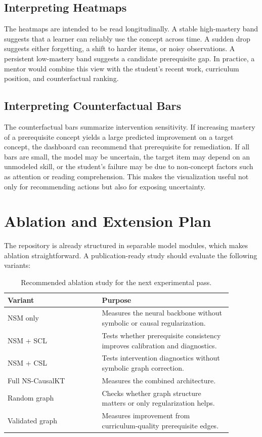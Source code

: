 \documentclass[conference]{IEEEtran}
\begin{document}
\subsection{Interpreting Heatmaps}
The heatmaps are intended to be read longitudinally. A stable high-mastery band suggests that a learner can reliably use the concept across time. A sudden drop suggests either forgetting, a shift to harder items, or noisy observations. A persistent low-mastery band suggests a candidate prerequisite gap. In practice, a mentor would combine this view with the student's recent work, curriculum position, and counterfactual ranking.

\subsection{Interpreting Counterfactual Bars}
The counterfactual bars summarize intervention sensitivity. If increasing mastery of a prerequisite concept yields a large predicted improvement on a target concept, the dashboard can recommend that prerequisite for remediation. If all bars are small, the model may be uncertain, the target item may depend on an unmodeled skill, or the student's failure may be due to non-concept factors such as attention or reading comprehension. This makes the visualization useful not only for recommending actions but also for exposing uncertainty.

\section{Ablation and Extension Plan}
The repository is already structured in separable model modules, which makes ablation straightforward. A publication-ready study should evaluate the following variants:
\begin{table}[t]
\centering
\caption{Recommended ablation study for the next experimental pass.}
\label{tab:ablation}
\begin{tabular}{p{0.37\linewidth}p{0.51\linewidth}}
\toprule
Variant & Purpose \\
\midrule
NSM only & Measures the neural backbone without symbolic or causal regularization. \\
NSM + SCL & Tests whether prerequisite consistency improves calibration and diagnostics. \\
NSM + CSL & Tests intervention diagnostics without symbolic graph correction. \\
Full NS-CausalKT & Measures the combined architecture. \\
Random graph & Checks whether graph structure matters or only regularization helps. \\
Validated graph & Measures improvement from curriculum-quality prerequisite edges. \\
\bottomrule
\end{tabular}
\end{table}
\end{document}
